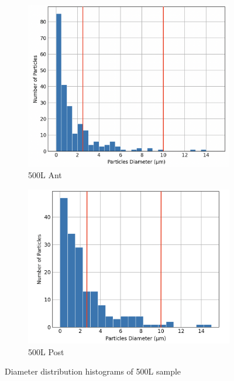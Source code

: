 \begin{figure}[H]
\centering
\begin{subfigure}{.5\textwidth}
  \centering
  \includegraphics[width=0.85\linewidth]{images/500L_Ant_D.png}
  \caption{500L Ant}
  \label{fig:500lant}
\end{subfigure}%
\begin{subfigure}{.5\textwidth}
  \centering
  \includegraphics[width=0.9\linewidth]{images/500L_Post_D.png}
  \caption{500L Post}
  \label{fig:500lpost}
\end{subfigure}
\caption{Diameter distribution histograms of 500L sample}
\label{fig:3}
\end{figure}

